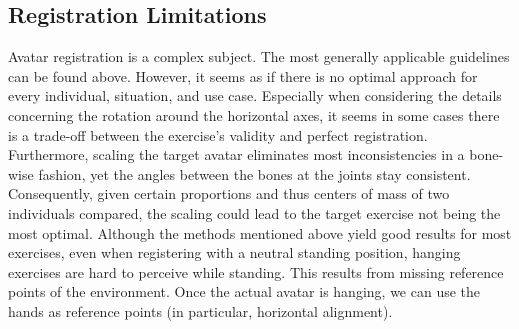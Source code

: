 \subsection*{Registration Limitations}
Avatar registration is a complex subject. The most generally applicable guidelines can be found above. However, it seems as if there is no optimal approach for every individual, situation, and use case. Especially when considering the details concerning the rotation around the horizontal axes, it seems in some cases there is a trade-off between the exercise's validity and perfect registration.
Furthermore, scaling the target avatar eliminates most inconsistencies in a bone-wise fashion, yet the angles between the bones at the joints stay consistent. Consequently, given certain proportions and thus centers of mass of two individuals compared, the scaling could lead to the target exercise not being the most optimal. Although the methods mentioned above yield good results for most exercises, even when registering with a neutral standing position, hanging exercises are hard to perceive while standing. This results from missing reference points of the environment. Once the actual avatar is hanging, we can use the hands as reference points (in particular, horizontal alignment).

